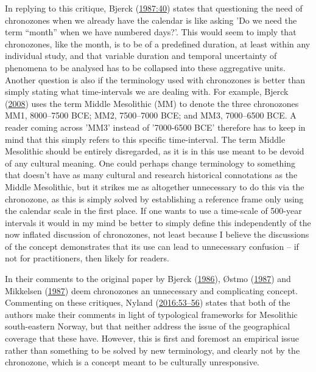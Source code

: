 \documentclass[
  a4paper,
  oneside]{uiophdthesis}
\begin{document}
In replying to this critique, Bjerck (\protect\hyperlink{ref-bjerck1987}{1987:40}) states that questioning the need of chronozones when we already have the calendar is like asking 'Do we need the term ``month'' when we have numbered days?'. This would seem to imply that chronozones, like the month, is to be of a predefined duration, at least within any individual study, and that variable duration and temporal uncertainty of phenomena to be analysed has to be collapsed into these aggregative units. Another question is also if the terminology used with chronozones is better than simply stating what time-intervals we are dealing with. For example, Bjerck (\protect\hyperlink{ref-bjerck2008}{2008}) uses the term Middle Mesolithic (MM) to denote the three chronozones MM1, 8000--7500 BCE; MM2, 7500--7000 BCE; and MM3, 7000--6500 BCE. A reader coming across 'MM3' instead of '7000-6500 BCE' therefore has to keep in mind that this simply refers to this specific time-interval. The term Middle Mesolithic should be entirely disregarded, as it is in this use meant to be devoid of any cultural meaning. One could perhaps change terminology to something that doesn't have as many cultural and research historical connotations as the Middle Mesolithic, but it strikes me as altogether unnecessary to do this via the chronozone, as this is simply solved by establishing a reference frame only using the calendar scale in the first place. If one wants to use a time-scale of 500-year intervals it would in my mind be better to simply define this independently of the now inflated discussion of chronozones, not least because I believe the discussions of the concept demonstrates that its use can lead to unnecessary confusion -- if not for practitioners, then likely for readers.

In their comments to the original paper by Bjerck (\protect\hyperlink{ref-bjerck1986}{1986}), Østmo (\protect\hyperlink{ref-uxf8stmo1987}{1987}) and Mikkelsen (\protect\hyperlink{ref-mikkelsen1987}{1987}) deem chronozones an unnecessary and complicating concept. Commenting on these critiques, Nyland (\protect\hyperlink{ref-nyland2016}{2016:53--56}) states that both of the authors make their comments in light of typological frameworks for Mesolithic south-eastern Norway, but that neither address the issue of the geographical coverage that these have. However, this is first and foremost an empirical issue rather than something to be solved by new terminology, and clearly not by the chronozone, which is a concept meant to be culturally unresponsive.
\end{document}
